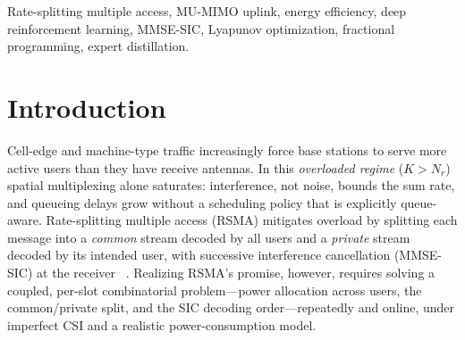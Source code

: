 \documentclass[journal]{IEEEtran}
\begin{document}
\begin{abstract}
gap (0.9519), so the learned policy's value is inference cost and model-free
deployment rather than absolute performance. A pre-registered fine-tuning campaign
further shows that released-learning-rate, trust-region, anchoring, and
data-reshaping variants all fall within the policy's own seed dispersion,
motivating multi-seed confidence-interval comparison as the honest reporting
standard for this class of methods. Finally, a Shapley-value-based
interpretability analysis (global feature-subset selection via the SVEA
classification game, plus expected-gradient attributions validated against a
model-agnostic KernelSHAP proxy under multiple reference constructions) shows
that the learned scheduler's power decisions are driven foremost by queue
backlog and channel gain, with the queue block as the dominant feature across
operating points.
\end{abstract}

\begin{IEEEkeywords}
Rate-splitting multiple access, MU-MIMO uplink, energy efficiency, deep
reinforcement learning, MMSE-SIC, Lyapunov optimization, fractional programming,
expert distillation.
\end{IEEEkeywords}

\section{Introduction}
\label{sec:intro}

Cell-edge and machine-type traffic increasingly force base stations to serve more
active users than they have receive antennas. In this \emph{overloaded regime}
($K > N_r$) spatial multiplexing alone saturates: interference, not noise, bounds
the sum rate, and queueing delays grow without a scheduling policy that is
explicitly queue-aware. Rate-splitting multiple access (RSMA) mitigates overload
by splitting each message into a \emph{common} stream decoded by all users and a
\emph{private} stream decoded by its intended user, with successive interference
cancellation (MMSE-SIC) at the receiver
~\cite{yu2022robust,karim2025uplink,clerckx2016rate}.
Realizing RSMA's promise, however, requires solving a coupled, per-slot
combinatorial problem---power allocation across users, the common/private split,
and the SIC decoding order---repeatedly and online, under imperfect CSI and a
realistic power-consumption model.
\end{document}
